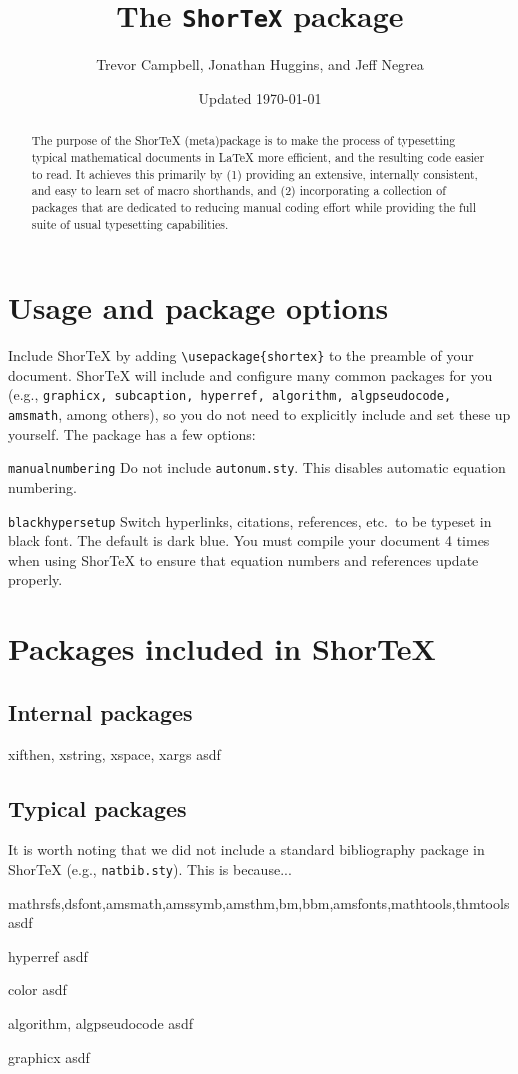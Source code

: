\documentclass{article}
\title{The \texttt{ShorTeX} package}
\author{Trevor Campbell, Jonathan Huggins, and Jeff Negrea}
\date{Updated \today}
\begin{document}
\maketitle

\begin{abstract}
The purpose of the ShorTeX (meta)package is to make the process of typesetting typical mathematical documents in \LaTeX
more efficient, and the resulting code easier to read. 
It achieves this primarily by (1) providing an extensive, internally consistent, and easy to learn set of macro shorthands,
and (2) incorporating a collection of packages that are dedicated to reducing manual coding effort while providing 
the full suite of usual typesetting capabilities.
\end{abstract}

\section{Usage and package options}\label{sec:usage}


Include ShorTeX by adding \verb!\usepackage{shortex}! to the preamble of your document.
ShorTeX will include and configure many common packages for you (e.g., \texttt{graphicx, subcaption, hyperref, algorithm, algpseudocode, amsmath}, among others),
so you do not need to explicitly include and set these up yourself.
The package has a few options:
\bdesc
\item[\texttt{manualnumbering}] Do not include \texttt{autonum.sty}. This disables automatic equation numbering.
\item[\texttt{blackhypersetup}] Switch hyperlinks, citations, references, etc.~to be typeset in black font. The default is dark blue.
\edesc
You must compile your document 4 times when using ShorTeX to ensure that equation
numbers and references update properly.

\section{Packages included in ShorTeX}
\subsection{Internal packages}
\bdesc
\item[xifthen, xstring, xspace, xargs] asdf
\edesc
\subsection{Typical packages}
It is worth noting that we did not include a standard bibliography package in ShorTeX (e.g., \verb!natbib.sty!).
This is because...
\bdesc
\item[mathrsfs,dsfont,amsmath,amssymb,amsthm,bm,bbm,amsfonts,mathtools,thmtools] asdf
\item[hyperref] asdf
\item[color] asdf
\item[algorithm, algpseudocode] asdf
\item[graphicx] asdf
\edesc
\end{document}
